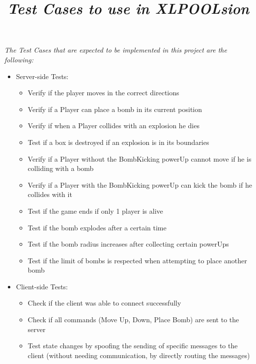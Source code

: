 \documentclass[12pt,a4paper]{article}
\title{\emph{{\Huge Test Cases to use in XLPOOLsion}}}
\date{}
\author{}
\begin{document}
\maketitle

\emph{\large The Test Cases that are expected to be implemented in this project are the following:}

\begin{itemize}
\item Server-side Tests:
	\begin{itemize}
	\item Verify if the player moves in the correct directions
	\item Verify if a Player can place a bomb in its current position
	\item Verify if when a Player collides with an explosion he dies
	\item Test if a box is destroyed if an explosion is in its boundaries
	\item Verify if a Player without the BombKicking powerUp cannot move if he is colliding with a bomb
	\item Verify if a Player with the BombKicking powerUp can kick the bomb if he collides with it
	\item Test if the game ends if only 1 player is alive
	\item Test if the bomb explodes after a certain time
	\item Test if the bomb radius increases after collecting certain powerUps
	\item Test if the limit of bombs is respected when attempting to place another bomb
	\end{itemize}
\item Client-side Tests:
	\begin{itemize}
	\item Check if the client was able to connect successfully
	\item Check if all commands (Move Up, Down, Place Bomb) are sent to the server
	\item Test state changes by spoofing the sending of specific messages to the client (without needing communication, by directly routing the messages)
	\end{itemize}
\end{itemize}
\end{document}

